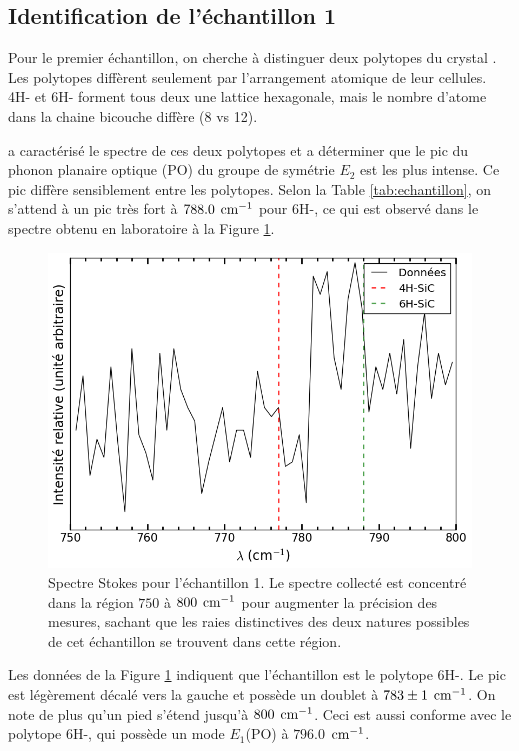 \documentclass[10pt,letterpaper,twocolumn]{article}
\newcommand{\unit}[1]{\hspace{0.15cm}\text{#1}}
\begin{document}
\subsection{Identification de l'échantillon 1}
Pour le premier échantillon, on cherche à distinguer deux polytopes du crystal . Les polytopes diffèrent seulement par l'arrangement atomique de leur cellules. 4H- et 6H- forment tous deux une lattice hexagonale, mais le nombre d'atome dans la chaine bicouche diffère (8 vs 12)\supercite{Feldman1968_4H}. \par \citeauthor{Burton1998}\supercite{Burton1998} a caractérisé le spectre de ces deux polytopes et a déterminer que le pic du phonon planaire optique (PO) du groupe de symétrie $E_2$ est les plus intense. Ce pic diffère sensiblement entre les polytopes. Selon la Table \ref{tab:echantillon}, on s'attend à un pic très fort à $788.0\unit{cm}^{-1}$ pour 6H-, ce qui est observé dans le spectre obtenu en laboratoire à la Figure \ref{fig:e1}.
\begin{figure}[H]
	\centering
	\includegraphics[width=0.8\linewidth]{figures/echantillon1.png}
	\caption{Spectre Stokes pour l'échantillon 1. Le spectre collecté est concentré dans la région $750$ à $800\unit{cm}^{-1}$ pour augmenter la précision des mesures, sachant que les raies distinctives des deux natures possibles de cet échantillon se trouvent dans cette région.}
	\label{fig:e1}
\end{figure}
Les données de la Figure \ref{fig:e1} indiquent que l'échantillon est le polytope 6H-. Le pic est légèrement décalé vers la gauche et possède un doublet à $783 \pm 1\unit{cm}^{-1}$. On note de plus qu'un pied s'étend jusqu'à $800\unit{cm}^{-1}$. Ceci est aussi conforme avec le polytope 6H-, qui possède un mode $E_1$(PO) à $796.0$\supercite{Burton1998}$\unit{cm}^{-1}$. 
\end{document}
